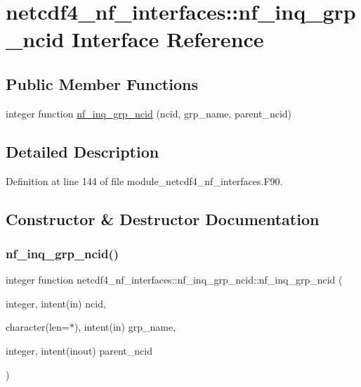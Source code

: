 \hypertarget{interfacenetcdf4__nf__interfaces_1_1nf__inq__grp__ncid}{}\section{netcdf4\+\_\+nf\+\_\+interfaces\+:\+:nf\+\_\+inq\+\_\+grp\+\_\+ncid Interface Reference}
\label{interfacenetcdf4__nf__interfaces_1_1nf__inq__grp__ncid}
\subsection*{Public Member Functions}
\begin{DoxyCompactItemize}
\item 
integer function \hyperlink{interfacenetcdf4__nf__interfaces_1_1nf__inq__grp__ncid_a1c9ee50613bda786359b08c80d479541}{nf\+\_\+inq\+\_\+grp\+\_\+ncid} (ncid, grp\+\_\+name, parent\+\_\+ncid)
\end{DoxyCompactItemize}


\subsection{Detailed Description}


Definition at line 144 of file module\+\_\+netcdf4\+\_\+nf\+\_\+interfaces.\+F90.



\subsection{Constructor \& Destructor Documentation}
\mbox{\label{interfacenetcdf4__nf__interfaces_1_1nf__inq__grp__ncid_a1c9ee50613bda786359b08c80d479541}} 
\subsubsection{\texorpdfstring{nf\+\_\+inq\+\_\+grp\+\_\+ncid()}{nf\_inq\_grp\_ncid()}}
{\footnotesize\ttfamily integer function netcdf4\+\_\+nf\+\_\+interfaces\+::nf\+\_\+inq\+\_\+grp\+\_\+ncid\+::nf\+\_\+inq\+\_\+grp\+\_\+ncid (\begin{DoxyParamCaption}\item[{integer, intent(in)}]{ncid,  }\item[{character(len=$\ast$), intent(in)}]{grp\+\_\+name,  }\item[{integer, intent(inout)}]{parent\+\_\+ncid }\end{DoxyParamCaption})}



